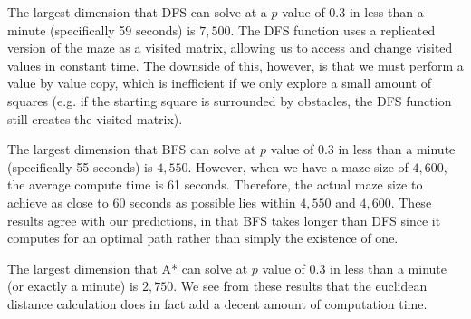 \documentclass[12pt, twoside]{article}
\begin{document}
\begin{enumerate}
        \vspace{4mm}
        The largest dimension that DFS can solve at a $p$ value of 0.3 in less than a minute (specifically 59 seconds) is $7,500$. The DFS function uses a replicated version of the maze as a visited matrix, allowing us to access and change visited values in constant time. The downside of this, however, is that we must perform a value by value copy, which is inefficient if we only explore a small amount of squares (e.g. if the starting square is surrounded by obstacles, the DFS function still creates the visited matrix).

        \vspace{4mm}
        The largest dimension that BFS can solve at $p$ value of 0.3 in less than a minute (specifically 55 seconds) is $4,550$. However, when we have a maze size of $4,600$, the average compute time is 61 seconds. Therefore, the actual maze size to achieve as close to 60 seconds as possible lies within $4,550$ and $4,600$. These results agree with our predictions, in that BFS takes longer than DFS since it computes for an optimal path rather than simply the existence of one.

        \vspace{4mm}
        The largest dimension that A* can solve at $p$ value of 0.3 in less than a minute (or exactly a minute) is $2,750$. We see from these results that the euclidean distance calculation does in fact add a decent amount of computation time. 

        \vfill

\end{enumerate}
\pagebreak
\end{document}
